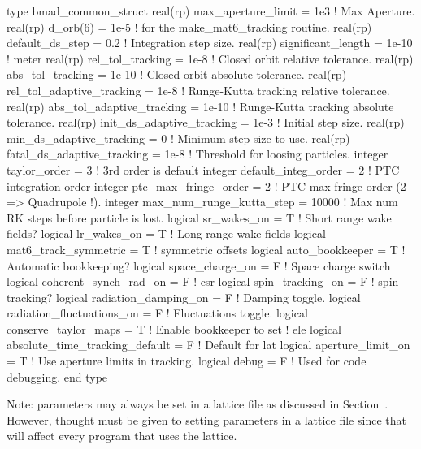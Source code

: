 \begin{example}
  type bmad_common_struct
    real(rp) max_aperture_limit = 1e3          ! Max Aperture.
    real(rp) d_orb(6)           = 1e-5         ! for the make_mat6_tracking routine.
    real(rp) default_ds_step    = 0.2          ! Integration step size.  
    real(rp) significant_length = 1e-10        ! meter 
    real(rp) rel_tol_tracking = 1e-8           ! Closed orbit relative tolerance.
    real(rp) abs_tol_tracking = 1e-10          ! Closed orbit absolute tolerance.
    real(rp) rel_tol_adaptive_tracking = 1e-8  ! Runge-Kutta tracking relative tolerance.
    real(rp) abs_tol_adaptive_tracking = 1e-10 ! Runge-Kutta tracking absolute tolerance.
    real(rp) init_ds_adaptive_tracking = 1e-3  ! Initial step size.
    real(rp) min_ds_adaptive_tracking = 0      ! Minimum step size to use.
    real(rp) fatal_ds_adaptive_tracking = 1e-8 ! Threshold for loosing particles.
    integer taylor_order = 3                   ! 3rd order is default
    integer default_integ_order = 2            ! PTC integration order
    integer ptc_max_fringe_order = 2           ! PTC max fringe order (2 => Quadrupole !).
    integer max_num_runge_kutta_step = 10000   ! Max num RK steps before particle is lost.
    logical sr_wakes_on = T                    ! Short range wake fields?
    logical lr_wakes_on = T                    ! Long range wake fields
    logical mat6_track_symmetric = T           ! symmetric offsets
    logical auto_bookkeeper = T                ! Automatic bookkeeping?
    logical space_charge_on = F                ! Space charge switch
    logical coherent_synch_rad_on = F          ! csr 
    logical spin_tracking_on = F               ! spin tracking?
    logical radiation_damping_on = F           ! Damping toggle.
    logical radiation_fluctuations_on = F      ! Fluctuations toggle.
    logical conserve_taylor_maps = T           ! Enable bookkeeper to set
                                               ! ele%
    logical absolute_time_tracking_default = F ! Default for lat%
    logical aperture_limit_on = T              ! Use aperture limits in tracking.
    logical debug = F                          ! Used for code debugging.
  end type
\end{example}

Note:  parameters may always be set in a lattice file as
discussed in Section~. However, thought must be given
to setting  parameters in a lattice file since that will
affect every program that uses the lattice.

